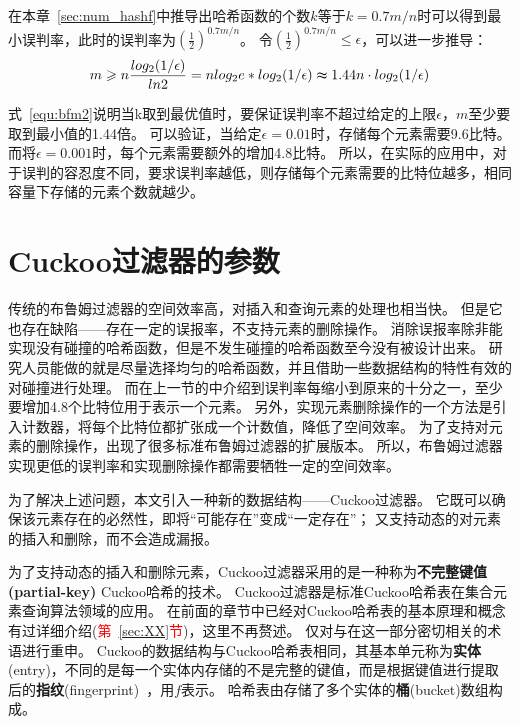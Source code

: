 在本章~\ref{sec:num_hashf}中推导出哈希函数的个数$k$等于$k = 0.7{m/n}$时可以得到最小误判率，此时的误判率为$(\frac{1}{2})^{0.7{m/n}}$。
令$(\frac{1}{2})^{0.7{m/n}} \leq \epsilon $，可以进一步推导：
\begin{equation}
m \geq n\frac{log_2({1/\epsilon})}{ln2} = nlog_2e\ast log_2({1/\epsilon}) \thickapprox 1.44n\cdot log_2({1/\epsilon})
\label{equ:bfm2}
\end{equation}

式~\ref{equ:bfm2}说明当k取到最优值时，要保证误判率不超过给定的上限$\epsilon$，$m$至少要取到最小值的1.44倍。
可以验证，当给定$\epsilon = 0.01$时，存储每个元素需要9.6比特。
而将$\epsilon = 0.001 $时，每个元素需要额外的增加4.8比特。
所以，在实际的应用中，对于误判的容忍度不同，要求误判率越低，则存储每个元素需要的比特位越多，相同容量下存储的元素个数就越少。

\section{Cuckoo过滤器的参数}
\label{sec:cbf_para}
传统的布鲁姆过滤器的空间效率高，对插入和查询元素的处理也相当快。
但是它也存在缺陷——存在一定的误报率，不支持元素的删除操作。
消除误报率除非能实现没有碰撞的哈希函数，但是不发生碰撞的哈希函数至今没有被设计出来。
研究人员能做的就是尽量选择均匀的哈希函数，并且借助一些数据结构的特性有效的对碰撞进行处理。
而在上一节的中介绍到误判率每缩小到原来的十分之一，至少要增加4.8个比特位用于表示一个元素。
另外，实现元素删除操作的一个方法是引入计数器，将每个比特位都扩张成一个计数值，降低了空间效率。
为了支持对元素的删除操作，出现了很多标准布鲁姆过滤器的扩展版本\cite{bender2012don,bonomi2006improved,fan2000summary}。
所以，布鲁姆过滤器实现更低的误判率和实现删除操作都需要牺牲一定的空间效率。

为了解决上述问题，本文引入一种新的数据结构——Cuckoo过滤器。
它既可以确保该元素存在的必然性，即将“可能存在”变成“一定存在”；
又支持动态的对元素的插入和删除，而不会造成漏报。


为了支持动态的插入和删除元素，Cuckoo过滤器采用的是一种称为\textbf{不完整键值(partial-key)} Cuckoo哈希的技术。
Cuckoo过滤器是标准Cuckoo哈希表在集合元素查询算法领域的应用。
在前面的章节中已经对Cuckoo哈希表的基本原理和概念有过详细介绍(\textcolor{red}{第~\ref{sec:XX}节})，这里不再赘述。
仅对与在这一部分密切相关的术语进行重申。
Cuckoo的数据结构与Cuckoo哈希表相同，其基本单元称为\textbf{实体}(entry)，不同的是每一个实体内存储的不是完整的键值，而是根据键值进行提取后的\textbf{指纹}(fingerprint)~\cite{memc3}，用$f$表示。
哈希表由存储了多个实体的\textbf{桶}(bucket)数组构成。

